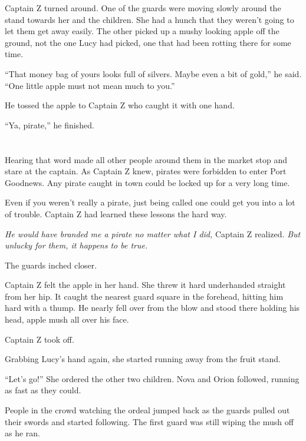 \documentclass[12pt]{extbook}
\begin{document}
  Captain Z turned around. One of the guards were moving slowly around the
  stand towards her and the children. She had a hunch that they weren't
  going to let them get away easily. The other picked up a mushy looking
  apple off the ground, not the one Lucy had picked, one that had been
  rotting there for some time.
  
  \enquote{That money bag of yours looks full of silvers. Maybe even a bit
  of gold,} he said. \enquote{One little apple must not mean much to you.}
  
  He tossed the apple to Captain Z who caught it with one hand.
  
  \enquote{Ya, pirate,} he finished.
  
  \section{}\label{section-32}
  
  Hearing that word made all other people around them in the market stop
  and stare at the captain. As Captain Z knew, pirates were forbidden to
  enter Port Goodnews. Any pirate caught in town could be locked up for a
  very long time.
  
  Even if you weren't really a pirate, just being called one could get you
  into a lot of trouble. Captain Z had learned these lessons the hard way.
  
  \emph{He would have branded me a pirate no matter what I did,} Captain Z
  realized. \emph{But unlucky for them, it happens to be true.}
  
  The guards inched closer.
  
  Captain Z felt the apple in her hand. She threw it hard underhanded
  straight from her hip. It caught the nearest guard square in the
  forehead, hitting him hard with a thump. He nearly fell over from the
  blow and stood there holding his head, apple mush all over his face.
  
  Captain Z took off.
  
  Grabbing Lucy's hand again, she started running away from the fruit
  stand.
  
  \enquote{Let's go!} She ordered the other two children. Nova and Orion
  followed, running as fast as they could.
  
  People in the crowd watching the ordeal jumped back as the guards pulled
  out their swords and started following. The first guard was still wiping
  the mush off as he ran.
  
\end{document}
